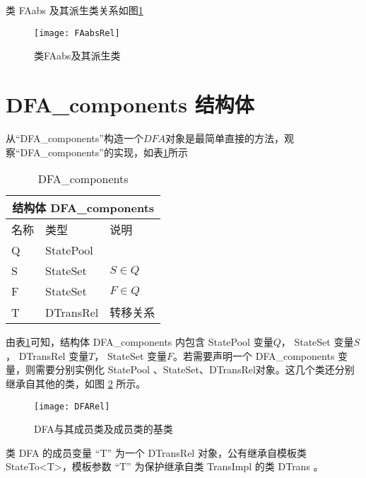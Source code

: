 类 FAabs 及其派生类关系如图\ref{fig:FAabsRel}

\begin{figure}[!htbp]
    \centering
    \texttt{[image: FAabsRel]}
    \caption{类FAabs及其派生类}
    \label{fig:FAabsRel}
\end{figure}

\section{DFA\_components 结构体}\label{sc:dfa_com}%

从“DFA\_components”构造一个$DFA$对象是最简单直接的方法，观察“DFA\_components”的实现，如表\ref{tab:DFA-components}所示
\begin{table}[!htbp]
    \caption{DFA\_components}
    \label{tab:DFA-components}
    \centering
    \small%
    \setlength{\tabcolsep}{4pt}%
    \renewcommand{\arraystretch}{1.2}%
        \begin{tabular}{p{3em}<{\centering} p{5em}<{\raggedright} p{5em}<{\raggedright}} %
        \toprule 
         \multicolumn{3}{c}{结构体 DFA\_components} \\
        \midrule
        名称& 类型 & \mbox{说明} \\
        \midrule
        Q & StatePool &           \\
        S & StateSet  &  $S\in Q$ \\
        F & StateSet  &  $F\in Q$ \\
        T & DTransRel &  转移关系  \\
        \bottomrule
    \end{tabular}
\end{table}
由表\ref{tab:DFA-components}可知，结构体 DFA\_components 内包含 StatePool 变量$Q$， StateSet 变量$S$， DTransRel 变量$T$， StateSet 变量$F$。若需要声明一个 DFA\_components 变量，则需要分别实例化 StatePool 、StateSet、DTransRel对象。这几个类还分别继承自其他的类，如图 \ref{fig:DFARel} 所示。

\begin{figure}[!htbp]
    \centering
    \texttt{[image: DFARel]}
    \caption{DFA与其成员类及成员类的基类}
    \label{fig:DFARel}
\end{figure}

类 DFA 的成员变量 “T” 为一个 DTransRel 对象，公有继承自模板类 StateTo<T>，模板参数 “T” 为保护继承自类 TransImpl 的类 DTrans 。

